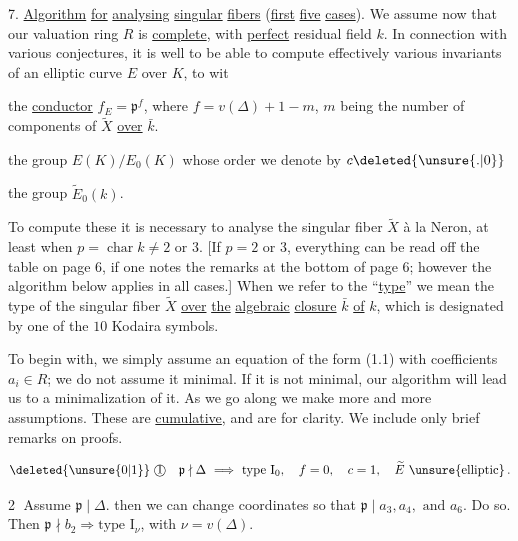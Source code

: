 7. \uline{Algorithm} \uline{for} \uline{analysing} \uline{singular} \uline{fibers} (\uline{first} \uline{five} \uline{cases}). We assume now that our valuation ring $R$ is \uline{complete}, with \uline{perfect} residual field $k$. In connection with various conjectures, it is well to be able to compute effectively various invariants of an elliptic curve $E$ over $K$, to wit

the \uline{conductor} $f_E={\mathfrak{p}}^{f}$, where $f=v(\Delta)+1-m$, $m$ being the number of components of $\widetilde X$ \uline{over} $\bar k$.

the group $E(K)/E_0(K)$ whose order we denote by $c\deleted{\unsure{.|0}}$

the group $\widetilde E_0(k)$.

To compute these it is necessary to analyse the singular fiber $\widetilde X$ à la Neron, at least when $p=\operatorname{char} k\ne2\text{ or }3$. \reversemarginpar{}[If $p=2$ or $3$, everything can be read off the table on page $6$,  if one notes the remarks at the bottom of page $6$; however the algorithm below applies in all cases.] When we refer to the ``\uline{type}'' we mean the type of the singular fiber $\widetilde X$ \uline{over} \uline{the} \uline{algebraic} \uline{closure} $\bar k$ \uline{of} $k$, which is designated by one of the $10$ Kodaira symbols.

To begin with, we simply assume an equation of the form (1.1) with coefficients $\boxed{a_i\in R}$; we do not assume it minimal. If it is not minimal, our algorithm will lead us to a minimalization of it. As we go along we make more and more assumptions. These are \uline{cumulative}, and are  for clarity. We include only brief remarks on proofs.

\[
\deleted{\unsure{0|1}}\;\text{\textcircled{1}}\quad
\mathfrak p\nmid\Delta\ \Longrightarrow\ \text{type }\mathrm I_0,\quad
 f=0,\quad c=1,\quad \widetilde E\ \text{\unsure{elliptic}}\,.
\]

\textcircled{2} Assume $\boxed{\mathfrak p\mid\Delta}$. then we can change coordinates so that $\boxed{\mathfrak p\mid a_3,a_4,\text{ and }a_6.}$ Do so. Then $\mathfrak p\nmid b_2\Longrightarrow\text{type }\mathrm I_{\nu}$, with $\nu=v(\Delta)$.

